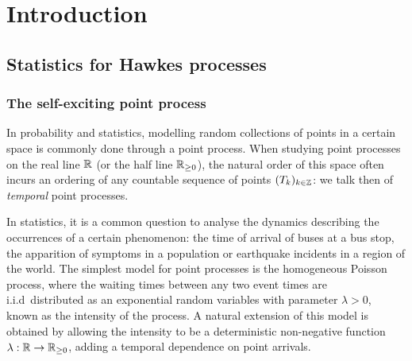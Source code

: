 
\chapter{Introduction}

\section{Statistics for Hawkes processes}\label{sec:chap0_introduction}
    \subsection{The self-exciting point process}
    In probability and statistics, modelling random collections of points in a certain space is commonly done through a point process.
    When studying point processes on the real line ${\mathbb R}$ (or the half line ${\mathbb R}_{\geq 0}$), the natural order of this space often incurs an ordering of any countable sequence of points $(T_k)_{k\in{\mathbb Z}}$: we talk then of \emph{temporal} point processes.

    In statistics, it is a common question to analyse the dynamics describing the occurrences of a certain phenomenon: the time of arrival of buses at a bus stop, the apparition of symptoms in a population or earthquake incidents in a region of the world.
    The simplest model for point processes is the homogeneous Poisson process, where the waiting times between any two event times are i.i.d\ distributed as an exponential random variables with parameter $\lambda > 0$, known as the intensity of the process.
    A natural extension of this model is obtained by allowing the intensity to be a deterministic non-negative function $\lambda:{\mathbb R} \to {\mathbb R}_{\geq0}$, adding a temporal dependence on point arrivals.

